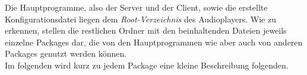 
Die Hauptprogramme, also der Server und der Client, sowie die erstellte Konfigurationsdatei liegen dem \textit{Root-Verzeichnis} des Audioplayers. Wie zu erkennen, stellen die restlichen Ordner mit den beinhaltenden Dateien jeweils einzelne Packages dar, die von den Hauptprogrammen wie aber auch von anderen Packages genutzt werden können. \\
Im folgenden wird kurz zu jedem Package eine kleine Beschreibung folgenden.
